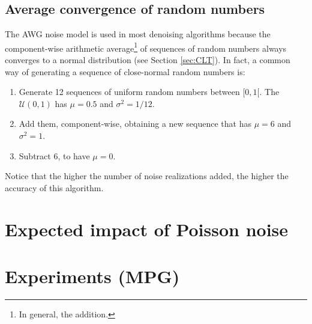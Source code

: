 \subsection{Average convergence of random numbers}
The \gls{AWG} noise model is used in most denoising algorithms because
the component-wise arithmetic average\footnote{In general, the
  addition.} of sequences of random numbers always converges to a
normal distribution (see Section \ref{sec:CLT}). In fact, a common way
of generating a sequence of close-normal random numbers is:
\begin{enumerate}
\item Generate 12 sequences of uniform random numbers between
  $[0, 1[$. The $\mathcal{U}(0,1)$ has $\mu=0.5$ and $\sigma^2=1/12$.
\item Add them, component-wise, obtaining a new sequence that has
  $\mu=6$ and $\sigma^2=1$.
\item Subtract $6$, to have $\mu=0$.
\end{enumerate}
Notice that the higher the number of noise realizations added, the
higher the accuracy of this algorithm.

\section{Expected impact of Poisson noise}

\section{Experiments (MPG)}

